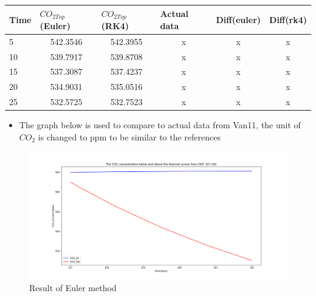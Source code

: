 \documentclass[a4paper]{article}
\numberwithin{equation}{section}
\begin{document}
\begin{table}[H]
\begin{tabular}{lccccc}
\hline
\textbf{Time} & \multicolumn{1}{l}{\(CO_{2Top}\)(Euler)} & \multicolumn{1}{l}{\(CO_{2Top}\)(RK4)} & \multicolumn{1}{l}{\textbf{Actual data}} & \multicolumn{1}{l}{\textbf{Diff(euler)}} & \multicolumn{1}{l}{\textbf{Diff(rk4)}} \\ \hline
5             & 542.3546                                 & 542.3955                               & x                                        & x                                        & x                                      \\
10            & 539.7917                                 & 539.8708                               & x                                        & x                                        & x                                      \\
15            & 537.3087                                 & 537.4237                               & x                                        & x                                        & x                                      \\
20            & 534.9031                                 & 535.0516                               & x                                        & x                                        & x                                      \\
25            & 532.5725                                 & 532.7523                               & x                                        & x                                        & x                                      \\ \hline
\end{tabular}
\end{table}

\begin{itemize}
    \item The graph below is used to compare to actual data from Van11, the unit of $CO_{2}$ is changed to ppm to be similar to the references
\end{itemize}

\begin{figure}[H]
  \centering
  \includegraphics[width=16cm]{CO2_compare_Euler.png}
  \caption{Result of Euler method}
\end{figure}
\end{document}
